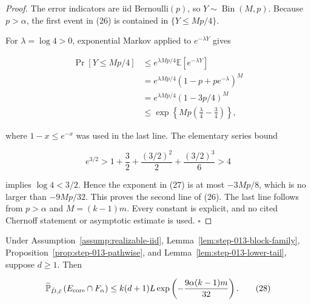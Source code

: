 \begin{proof}
The error indicators are iid Bernoulli\((p)\), so
\(Y\sim\operatorname{Bin}(M,p)\). Because \(p>\alpha\), the first event in
(26) is contained in \(\{Y\leq Mp/4\}\).

For \(\lambda=\log4>0\), exponential Markov applied to
\(e^{-\lambda Y}\) gives

\[
\begin{aligned}
 \Pr[Y\leq Mp/4]
 &\leq e^{\lambda Mp/4}\mathbb E[e^{-\lambda Y}]\\
 &=e^{\lambda Mp/4}(1-p+pe^{-\lambda})^M\\
 &=e^{\lambda Mp/4}(1-3p/4)^M\\
 &\leq\exp\left\{Mp\left(\frac{\lambda}{4}-\frac34\right)\right\},
\end{aligned}
 \tag{27}
\]

where \(1-x\leq e^{-x}\) was used in the last line. The elementary series
bound

\[
 e^{3/2}>1+\frac32+\frac{(3/2)^2}{2}
              +\frac{(3/2)^3}{6}>4
\]

implies \(\log4<3/2\). Hence the exponent in (27) is at most
\(-3Mp/8\), which is no larger than \(-9Mp/32\). This proves the second
line of (26). The last line follows from \(p>\alpha\) and
\(M=(k-1)m\). Every constant is explicit, and no cited Chernoff statement
or asymptotic estimate is used. \(\square\)


\end{proof}

\begin{proposition}\label{prop:step-013-finite-integration}
Under Assumption~\ref{assump:realizable-iid},
Lemma~\ref{lem:step-013-block-family},
Proposition~\ref{prop:step-013-pathwise}, and
Lemma~\ref{lem:step-013-lower-tail}, suppose \(d\geq1\). Then

\[
 \widetilde{\mathbb P}_{\bar D,\bar c}
 \left(E_{\rm core}\cap F_\alpha\right)
 \leq k(d+1)L
       \exp\left(-\frac{9\alpha(k-1)m}{32}\right).
 \tag{28}
\]


\end{proposition}

